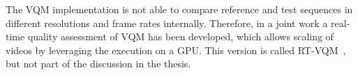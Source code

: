 The \ac{VQM} implementation is not able to compare reference and test sequences in different resolutions and frame rates internally. 
Therefore, in a joint work a real-time quality assessment of \ac{VQM} has been developed, which allows scaling of videos by leveraging the execution on a \ac{GPU}.
This version is called RT-VQM~\cite{Wichtlhuber2016}, but not part of the discussion in the thesis.

%
%
